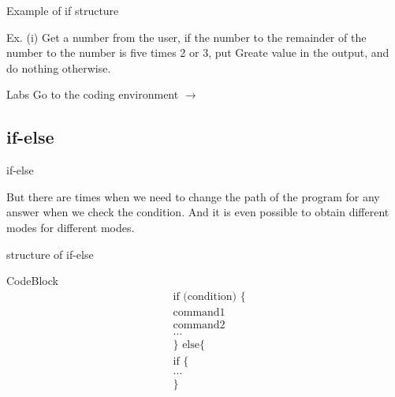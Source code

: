 \documentclass{beamer}\usepackage[]{graphicx}\usepackage[]{xcolor}
\begin{document}
\begin{frame}{Example of if structure}
\begin{exampleblock}{Ex. (i)}
    Get a number from the user, if the number to the remainder of the number to the number is five times 2 or 3, put Greate value in the output, and do nothing otherwise.
\end{exampleblock}
\end{frame}



\begin{frame}{Labs}
    \alert{{\Large Go to the coding environment $\rightarrow$}}
\end{frame}













\subsection{if-else}
\begin{frame}{if-else}
    \begin{block}
        But there are times when we need to change the path of the program for any answer when we check the condition. And it is even possible to obtain different modes for different modes.
    \end{block}
\end{frame}

\begin{frame}{structure of if-else}
    \begin{block}{CodeBlock}
\begin{align*}
    & \text{if (condition) \{} \\
    & \text{command1} \\
    & \text{command2} \\
    & \dots \\
    & \text{\}}\text{~else\{}\\
    & \text{if \{}\\
    & \dots \\
    & \text{\}}
\end{align*}
\end{block}
    
\end{frame}
\end{document}
